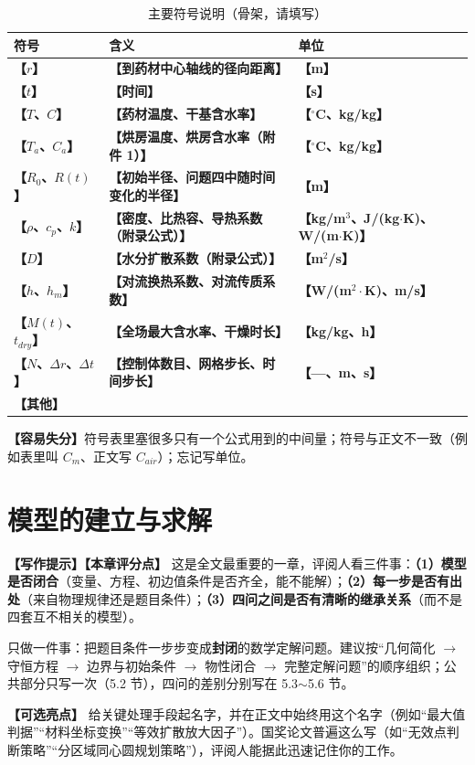 \documentclass[12pt,a4paper]{article}
\newcommand{\prompt}[1]{\par\noindent\textbf{【写作提示】}#1\par}      %
\newcommand{\pitfall}[1]{\par\noindent\textbf{【容易失分】}#1\par}     %
\newcommand{\ph}[1]{\textbf{【#1】}}                                   %
\begin{document}
\begin{table}[H]
\centering
\caption{主要符号说明（骨架，请填写）}
\label{tab:symbol}
\begin{tabular}{p{2.4cm}p{9.0cm}p{2.6cm}}
\toprule
符号 & 含义 & 单位\\
\midrule
\ph{$r$} & \ph{到药材中心轴线的径向距离} & \ph{m}\\
\ph{$t$} & \ph{时间} & \ph{s}\\
\ph{$T$、$C$} & \ph{药材温度、干基含水率} & \ph{$^\circ$C、kg/kg}\\
\ph{$T_a$、$C_a$} & \ph{烘房温度、烘房含水率（附件 1）} & \ph{$^\circ$C、kg/kg}\\
\ph{$R_0$、$R(t)$} & \ph{初始半径、问题四中随时间变化的半径} & \ph{m}\\
\ph{$\rho$、$c_p$、$k$} & \ph{密度、比热容、导热系数（附录公式）} & \ph{kg/m$^3$、J/(kg$\cdot$K)、W/(m$\cdot$K)}\\
\ph{$D$} & \ph{水分扩散系数（附录公式）} & \ph{m$^2$/s}\\
\ph{$h$、$h_m$} & \ph{对流换热系数、对流传质系数} & \ph{W/(m$^2\cdot$K)、m/s}\\
\ph{$M(t)$、$t_{dry}$} & \ph{全场最大含水率、干燥时长} & \ph{kg/kg、h}\\
\ph{$N$、$\Delta r$、$\Delta t$} & \ph{控制体数目、网格步长、时间步长} & \ph{---、m、s}\\
\ph{其他} & & \\
\bottomrule
\end{tabular}
\end{table}

\pitfall{符号表里塞很多只有一个公式用到的中间量；符号与正文不一致（例如表里叫 $C_m$、正文写 $C_{air}$）；忘记写单位。}

\clearpage

\section{模型的建立与求解}

\prompt{\textbf{【本章评分点】} 这是全文最重要的一章，评阅人看三件事：\textbf{（1）模型是否闭合}（变量、方程、初边值条件是否齐全，能不能解）；\textbf{（2）每一步是否有出处}（来自物理规律还是题目条件）；\textbf{（3）四问之间是否有清晰的继承关系}（而不是四套互不相关的模型）。

只做一件事：把题目条件一步步变成\textbf{封闭}的数学定解问题。建议按“几何简化 $\rightarrow$ 守恒方程 $\rightarrow$ 边界与初始条件 $\rightarrow$ 物性闭合 $\rightarrow$ 完整定解问题”的顺序组织；公共部分只写一次（5.2 节），四问的差别分别写在 5.3$\sim$5.6 节。

\textbf{【可选亮点】} 给关键处理手段起名字，并在正文中始终用这个名字（例如“最大值判据”“材料坐标变换”“等效扩散放大因子”）。国奖论文普遍这么写（如“无效点判断策略”“分区域同心圆规划策略”），评阅人能据此迅速记住你的工作。}
\end{document}
